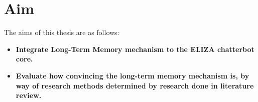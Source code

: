 %
%

\section*{Aim}
The aims of this thesis are as follows:
\begin{itemize}
	\item \textbf{Integrate Long-Term Memory mechanism to the ELIZA chatterbot core.}
	\item \textbf{Evaluate how convincing the long-term memory mechanism is, by way of research methods determined by research done in literature review.}
\end{itemize}